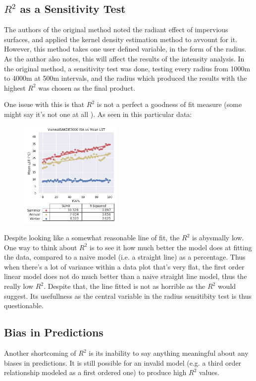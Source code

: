\documentclass{article}
\begin{document}
\subsection{$R^2$ as a Sensitivity Test}
The authors of the original method noted the radiant effect of impervious surfaces, and applied the kernel density estimation method to avvount for it. However, this method takes one user defined variable, in the form of the radius. As the author also notes, this will affect the results of the intensity analysis. In the original method, a sensitivity test was done, testing every radius from 1000m to 4000m at 500m intervals, and the radius which produced the results with the highest $R^2$ was chosen as the final product.

One issue with this is that $R^2$ is not a perfect a goodness of fit measure (some might say it's not one at all \cite{r_squared_distractions}). As seen in this particular data:
\begin{figure}[h]
    \centering
    \includegraphics[width=5cm]{ViennaISAKDE3000.png}
\end{figure}

Despite looking like a somewhat reasonable line of fit, the $R^2$ is abysmally low. One way to think about $R^2$ is to see it how much better the model does at fitting the data, compared to a naive model (i.e. a straight line) as a percentage. Thus when there's a lot of variance within a data plot that's very flat, the first order linear model does not do much better than a naive straight line model, thus the really low $R^2$. Despite that, the line fitted is not as horrible as the $R^2$ would suggest. Its usefullness as the central variable in the radius sensitibity test is thus questionable.

\subsection{Bias in Predictions}
Another shortcoming of $R^2$ is its inability to say anything meaningful about any biases in predictions. It is still possible for an invalid model (e.g. a third order relationship modeled as a first ordered one) to produce high $R^2$ values.
\end{document}
